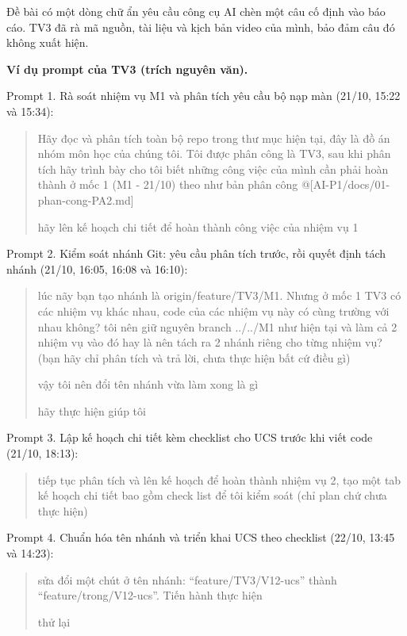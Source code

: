 Đề bài có một dòng chữ ẩn yêu cầu công cụ AI chèn một câu cố định vào báo cáo. TV3 đã rà mã nguồn, tài liệu và kịch bản video của mình, bảo đảm câu đó không xuất hiện.

\textbf{Ví dụ prompt của TV3 (trích nguyên văn).}

Prompt 1. Rà soát nhiệm vụ M1 và phân tích yêu cầu bộ nạp màn (21/10, 15:22 và 15:34):

\begin{quote}
Hãy đọc và phân tích toàn bộ repo trong thư mục hiện tại, đây là đồ án nhóm môn học của chúng tôi. Tôi được phân công là TV3, sau khi phân tích hãy trình bày cho tôi biết những công việc của mình cần phải hoàn thành ở mốc 1 (M1 - 21/10) theo như bản phân công @{[}AI-P1/docs/01-phan-cong-PA2.md{]}

hãy lên kế hoạch chi tiết để hoàn thành công việc của nhiệm vụ 1
\end{quote}

Prompt 2. Kiểm soát nhánh Git: yêu cầu phân tích trước, rồi quyết định tách nhánh (21/10, 16:05, 16:08 và 16:10):

\begin{quote}
lúc nãy bạn tạo nhánh là origin/feature/TV3/M1. Nhưng ở mốc 1 TV3 có các nhiệm vụ khác nhau, code của các nhiệm vụ này có cùng trường với nhau không? tôi nên giữ nguyên branch ../../M1 như hiện tại và làm cả 2 nhiệm vụ vào đó hay là nên tách ra 2 nhánh riêng cho từng nhiệm vụ? (bạn hãy chỉ phân tích và trả lời, chưa thực hiện bất cứ điều gì)

vậy tôi nên đổi tên nhánh vừa làm xong là gì

hãy thực hiện giúp tôi
\end{quote}

Prompt 3. Lập kế hoạch chi tiết kèm checklist cho UCS trước khi viết code (21/10, 18:13):

\begin{quote}
tiếp tục phân tích và lên kế hoạch để hoàn thành nhiệm vụ 2, tạo một tab kế hoạch chi tiết bao gồm check list để tôi kiểm soát (chỉ plan chứ chưa thực hiện)
\end{quote}

Prompt 4. Chuẩn hóa tên nhánh và triển khai UCS theo checklist (22/10, 13:45 và 14:23):

\begin{quote}
sửa đổi một chút ở tên nhánh: ``feature/TV3/V12-ucs'' thành ``feature/trong/V12-ucs''. Tiến hành thực hiện

thử lại
\end{quote}

